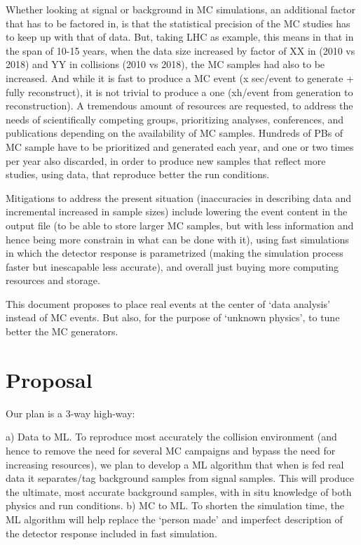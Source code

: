 Whether looking at signal or background in MC simulations, an additional factor that has to be factored in, is that the statistical precision of the MC studies has to keep up with that of data. But, taking LHC as example, this means in that in the span of 10-15 years, when the data size increased by factor of XX in \pp (2010 vs 2018) and YY in \PbPb collisions (2010 vs 2018), the MC samples had also to be increased. And while it is fast to produce a \pp MC event (x sec/event to generate + fully reconstruct), it is not trivial to produce a \PbPb one (xh/event from generation to reconstruction). A tremendous amount of resources are requested, to address the needs of scientifically competing groups, prioritizing analyses, conferences, and publications depending on the availability of MC samples. Hundreds of PBs of MC sample have to be prioritized and generated each year, and one or two times per year also discarded, in order to produce new samples that reflect more studies, using data, that reproduce better the run conditions. 

Mitigations to address the present situation (inaccuracies in describing data and incremental increased in sample sizes) include lowering the event content in the output file (to be able to store larger MC samples, but with less information and hence being more constrain in what can be done with it), using fast simulations in which the detector response is parametrized (making the simulation process faster but inescapable less accurate), and overall just buying more computing resources and storage. 

This document proposes to place real events at the center of `data analysis' instead of MC events. But also, for the purpose of `unknown physics', to tune better the MC generators.

\section{Proposal}
Our plan is a 3-way high-way: 

a) Data to ML. To reproduce most accurately the collision environment (and hence to remove the need for several MC campaigns and bypass the need for increasing resources), we plan to develop a ML algorithm that when is fed real data it separates/tag  background samples from signal samples. This will produce the ultimate, most accurate background samples, with in situ knowledge of both physics and run conditions. 
b) MC to ML. To shorten the simulation time, the ML algorithm will help replace the `person made' and imperfect description of the detector response included in fast simulation.  

